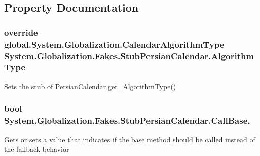 \subsection{Property Documentation}
\hypertarget{class_system_1_1_globalization_1_1_fakes_1_1_stub_persian_calendar_ae570d1a09a84624bbeaf50902ebb9730}{
\subsubsection[{Algorithm\-Type}]{\setlength{\rightskip}{0pt plus 5cm}override global.\-System.\-Globalization.\-Calendar\-Algorithm\-Type System.\-Globalization.\-Fakes.\-Stub\-Persian\-Calendar.\-Algorithm\-Type\hspace{0.3cm}{\ttfamily [get]}}}\label{class_system_1_1_globalization_1_1_fakes_1_1_stub_persian_calendar_ae570d1a09a84624bbeaf50902ebb9730}


Sets the stub of Persian\-Calendar.\-get\-\_\-\-Algorithm\-Type()

\hypertarget{class_system_1_1_globalization_1_1_fakes_1_1_stub_persian_calendar_a5c025e8236739c8e0554dcb0c5af3103}{
\subsubsection[{Call\-Base}]{\setlength{\rightskip}{0pt plus 5cm}bool System.\-Globalization.\-Fakes.\-Stub\-Persian\-Calendar.\-Call\-Base\hspace{0.3cm}{\ttfamily [get]}, {\ttfamily [set]}}}\label{class_system_1_1_globalization_1_1_fakes_1_1_stub_persian_calendar_a5c025e8236739c8e0554dcb0c5af3103}


Gets or sets a value that indicates if the base method should be called instead of the fallback behavior

